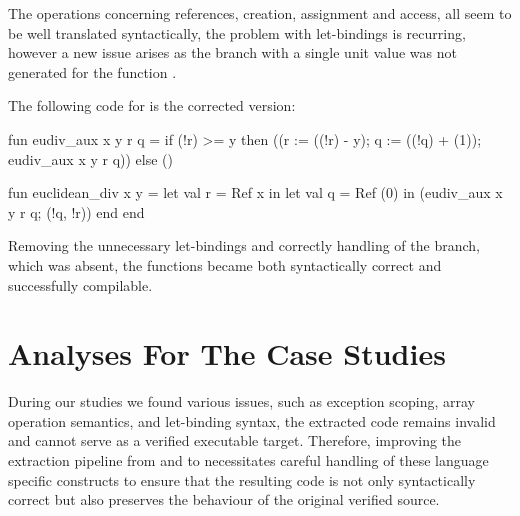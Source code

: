 The operations concerning references, creation, assignment and access, all seem to be well translated syntactically, the problem with
let-bindings is recurring, however a new issue arises as the  branch with a single unit value was not generated for the 
function .

The following code for \cml is the corrected version:

\begin{cakeml}
fun eudiv_aux x y r q =
  if (!r) >= y
  then ((r := ((!r) - y); q := ((!q) + (1)); eudiv_aux x y r q))
  else ()

fun euclidean_div x y =
  let val r = Ref x in
  let val q = Ref (0) in (eudiv_aux x y r q; (!q, !r)) 
end end
\end{cakeml}

Removing the unnecessary let-bindings and correctly handling of the  branch, which was absent, the functions became 
both syntactically correct and successfully compilable.

\section{Analyses For The Case Studies}

During our studies we found various issues, such as exception scoping, array operation semantics, and let-binding syntax, the extracted 
code remains invalid and cannot serve as a verified executable target. Therefore, improving the extraction pipeline from \ocaml and 
\gospel to \cml necessitates careful handling of these language specific constructs to ensure that the resulting code is not only 
syntactically correct but also preserves the behaviour of the original verified source.
